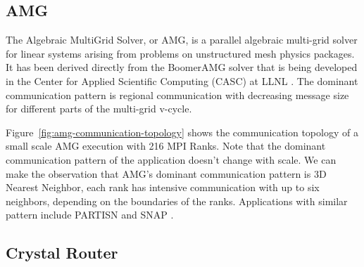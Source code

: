 \subsection{AMG}
\label{sec:amg}


The Algebraic MultiGrid Solver, or AMG, is a parallel algebraic multi-grid solver for linear systems arising from problems on unstructured mesh physics packages. It has been derived directly from the BoomerAMG solver that is being developed in the Center for Applied Scientific Computing (CASC) at LLNL \cite{amg}. The dominant communication pattern is regional communication with decreasing message size for different parts of the multi-grid v-cycle.

Figure~\ref{fig:amg-communication-topology} shows the communication topology of a small scale AMG execution with 216 MPI Ranks. Note that the dominant communication pattern of the application doesn't change with scale. We can make the observation that AMG's dominant communication pattern is 3D Nearest Neighbor, each rank has intensive communication with up to six neighbors, depending on the boundaries of the ranks. Applications with similar pattern include PARTISN \cite{partisn} and SNAP \cite{snap}.


\subsection{Crystal Router}
\label{sec:crystalrouter}

